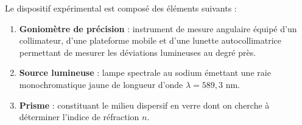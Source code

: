 Le dispositif expérimental est composé des éléments suivants :
\begin{enumerate}
    \item \textbf{Goniomètre de précision} : instrument de mesure angulaire équipé d'un collimateur, d'une plateforme mobile et d'une lunette autocollimatrice permettant de mesurer les déviations lumineuses au degré près.
    \item \textbf{Source lumineuse} : lampe spectrale au sodium émettant une raie monochromatique jaune de longueur d'onde $\lambda = 589,3$ nm.
    \item \textbf{Prisme} : constituant le milieu dispersif en verre dont on cherche à déterminer l'indice de réfraction $n$.
\end{enumerate}
